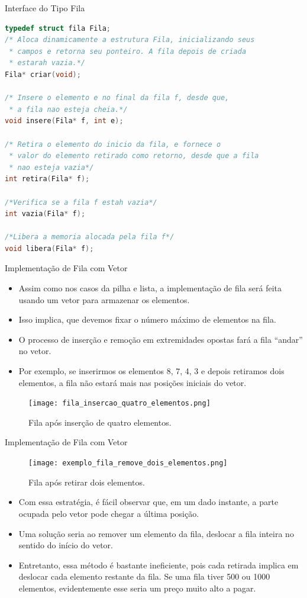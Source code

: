 \begin{frame}{Interface do Tipo Fila}
\footnotesize
\begin{lstlisting}[language=C]
typedef struct fila Fila;
/* Aloca dinamicamente a estrutura Fila, inicializando seus
 * campos e retorna seu ponteiro. A fila depois de criada
 * estarah vazia.*/
Fila* criar(void);

/* Insere o elemento e no final da fila f, desde que,
 * a fila nao esteja cheia.*/
void insere(Fila* f, int e);

/* Retira o elemento do inicio da fila, e fornece o 
 * valor do elemento retirado como retorno, desde que a fila
 * nao esteja vazia*/
int retira(Fila* f);

/*Verifica se a fila f estah vazia*/
int vazia(Fila* f);

/*Libera a memoria alocada pela fila f*/
void libera(Fila* f);
\end{lstlisting}
\end{frame}

\begin{frame}{Implementação de Fila com Vetor}
	\begin{itemize}
		\item Assim como nos casos da pilha e lista, a implementação de fila será feita usando um vetor para armazenar os elementos.
		\item Isso implica, que devemos fixar o número máximo de elementos na fila.
		\item O processo de inserção e remoção em extremidades opostas fará a fila ``andar'' no vetor.
		\item Por exemplo, se inserirmos os elementos 8, 7, 4, 3 e depois retiramos dois elementos, a fila não estará mais nas posições iniciais do vetor.
	\end{itemize}
	\begin{figure}[ht]
				\centering
				\texttt{[image: fila\_insercao\_quatro\_elementos.png]}
				\caption{Fila após inserção de quatro elementos.}	
	\end{figure} 	
\end{frame}

\begin{frame}{Implementação de Fila com Vetor}	
	\begin{figure}[ht]
				\centering
				\texttt{[image: exemplo\_fila\_remove\_dois\_elementos.png]}
				\caption{Fila após retirar dois elementos.}	
	\end{figure} 	
	\begin{itemize}
		\item Com essa estratégia, é fácil observar que, em um dado instante, a parte ocupada pelo vetor pode chegar a última posição.
		\item Uma solução seria ao remover um elemento da fila, deslocar a fila inteira no sentido do início do vetor.
		\item Entretanto, essa método é bastante ineficiente, pois cada retirada implica em deslocar cada elemento restante da fila. Se uma fila tiver 500 ou 1000 elementos, evidentemente esse seria um preço muito alto a pagar.		
	\end{itemize}
\end{frame}

